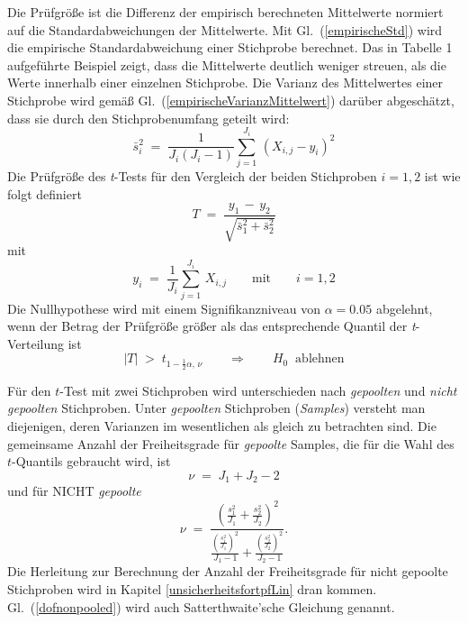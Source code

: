 Die Prüfgröße ist die Differenz der empirisch berechneten Mittelwerte normiert auf die
Standardabweichungen der Mittelwerte. Mit Gl.~(\ref{empirischeStd}) wird die
empirische Standardabweichung einer Stichprobe berechnet. Das in Tabelle 1 aufgeführte
Beispiel zeigt, dass die Mittelwerte deutlich weniger streuen, als die Werte innerhalb
einer einzelnen Stichprobe. Die Varianz des Mittelwertes einer Stichprobe wird gemäß
Gl.~(\ref{empirischeVarianzMittelwert})
darüber abgeschätzt, dass sie durch den Stichprobenumfang geteilt wird:
\begin{equation}
\bar s_i^2 \; = \; \frac{1}{J_i (J_i - 1)} \sum_{j=1}^{J_i} \, (X_{i,j} - y_i)^2
\end{equation}
Die Prüfgröße des \textsl{t}-Tests für den Vergleich der beiden Stichproben $i = 1,2$ ist wie folgt definiert
\begin{equation}
T \; = \; \frac{y_1 \, - \, y_2}{\sqrt{\bar s_1^2 + \bar s_2^2}}
\label{tTest}
\end{equation}
mit
\begin{equation}
y_i \; = \; \frac{1}{J_i}\sum_{j=1}^{J_i} \, X_{i,j} \qquad \mathrm{mit} \qquad
i = 1, 2
\end{equation}
Die Nullhypothese wird mit einem Signifikanzniveau von $\alpha = 0.05$ abgelehnt, wenn
der Betrag der Prüfgröße größer als das entsprechende Quantil der \textsl{t}-Verteilung ist
\begin{equation}
|T| \; > \; t_{1-\frac{1}{2} \alpha, \, \nu} \qquad \Rightarrow \qquad H_0 \; \; \mathrm{ablehnen}
\end{equation}


Für den $t$-Test mit zwei Stichproben wird unterschieden nach \textsl{gepoolten} und \textsl{nicht gepoolten}
Stichproben. Unter \textsl{gepoolten} Stichproben (\textsl{Samples}) versteht man diejenigen, deren Varianzen
im wesentlichen als gleich zu betrachten sind.
Die gemeinsame Anzahl der Freiheitsgrade für \textsl{gepoolte} Samples, die für die Wahl des $t$-Quantils gebraucht wird, ist
\begin{equation}
\nu \; = \; J_1 + J_2 - 2
\label{dofpooled}
\end{equation}
und für NICHT \textsl{gepoolte}
\begin{equation}
\nu \; = \;
 \frac{ \left(\frac{s_1^2}{J_1} +\frac{s_2^2}{J_2}\right)^2}{
  \frac{\left(\frac{s_1^2}{J_1}\right)^2}{J_1 - 1} + \frac{\left(\frac{s_2^2}{J_2}\right)^2}{J_2 - 1} } .
\label{dofnonpooled}
\end{equation}
Die Herleitung zur Berechnung der Anzahl der Freiheitsgrade für nicht gepoolte Stichproben
wird in Kapitel \ref{unsicherheitsfortpfLin} dran kommen. Gl.~(\ref{dofnonpooled}) wird auch
Satterthwaite'sche Gleichung genannt.

